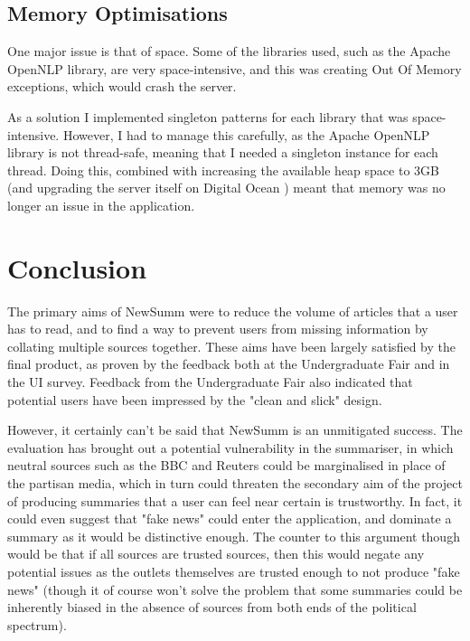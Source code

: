 \documentclass[12pt]{article}
\begin{document}
\label{apioptimisation}

\subsection{Memory Optimisations}

One major issue is that of space. Some of the libraries used, such as the Apache OpenNLP \cite{opennlp} library, are very space-intensive, and this was creating Out Of Memory exceptions, which would crash the server. 

As a solution I implemented singleton patterns for each library that was space-intensive. However, I had to manage this carefully, as the Apache OpenNLP library is not thread-safe, meaning that I needed a singleton instance for each thread. Doing this, combined with increasing the available heap space to 3GB (and upgrading the server itself on Digital Ocean \cite{digitalOcean}) meant that memory was no longer an issue in the application.


\newpage

\section{Conclusion}

The primary aims of NewSumm were to reduce the volume of articles that a user has to read, and to find a way to prevent users from missing information by collating multiple sources together. These aims have been largely satisfied by the final product, as proven by the feedback both at the Undergraduate Fair and in the UI survey. Feedback from the Undergraduate Fair also indicated that potential users have been impressed by the "clean and slick" design.

However, it certainly can't be said that NewSumm is an unmitigated success. The evaluation has brought out a potential vulnerability in the summariser, in which neutral sources such as the BBC \cite{bbc} and Reuters \cite{reuters} could be marginalised in place of the partisan media, which in turn could threaten the secondary aim of the project of producing summaries that a user can feel near certain is trustworthy. In fact, it could even suggest that "fake news" could enter the application, and dominate a summary as it would be distinctive enough. The counter to this argument though would be that if all sources are trusted sources, then this would negate any potential issues as the outlets themselves are trusted enough to not produce "fake news" (though it of course won't solve the problem that some summaries could be inherently biased in the absence of sources from both ends of the political spectrum).
\end{document}
